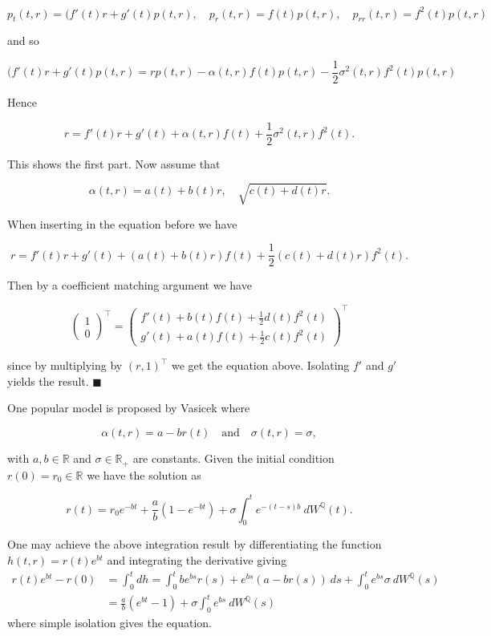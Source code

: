 \documentclass[a4paper,10pt,openany]{book}
\begin{document}
\[
p_t(t,r)=(f'(t)r+g'(t)p(t,r),\quad p_r(t,r)=f(t)p(t,r),\quad p_{rr}(t,r)=f^2(t)p(t,r)
\]

and so

\[
(f'(t)r+g'(t)p(t,r)=rp(t,r)-\alpha(t,r)f(t)p(t,r)-\frac{1}{2}\sigma^2(t,r)f^2(t)p(t,r)
\]

Hence

\[
r=f'(t)r+g'(t)+\alpha(t,r)f(t)+\frac{1}{2}\sigma^2(t,r)f^2(t).
\]

This shows the first part. Now assume that

\[
\alpha(t,r)=a(t)+b(t)r,\quad\sqrt{c(t)+d(t)r}.
\]

When inserting in the equation before we have

\[
 r=f'(t)r+g'(t)+(a(t)+b(t)r)f(t)+\frac{1}{2}(c(t)+d(t)r)f^2(t).
\]

Then by a coefficient matching argument we have

\[
\begin{pmatrix}
1\\ 0
\end{pmatrix}^\top=
\begin{pmatrix}
f'(t)+b(t)f(t)+\frac{1}{2}d(t)f^2(t)\\
g'(t)+a(t)f(t)+\frac{1}{2}c(t)f^2(t)
\end{pmatrix}^\top
\]

since by multiplying by \((r,1)^\top\) we get the equation above. Isolating \(f'\) and \(g'\) yields the result. \(\blacksquare\)

One popular model is proposed by Vasicek where

\[
\alpha(t,r)=a-br(t)\quad \text{and}\quad \sigma(t,r)=\sigma,
\]

with \(a,b\in \mathbb R\) and \(\sigma\in\mathbb R_+\) are constants. Given the initial condition \(r(0)=r_0\in\mathbb R\) we have the solution as

\[
r(t)=r_0e^{-bt}+\frac{a}{b}\left(1-e^{-bt}\right)+\sigma\int_0^t e^{-(t-s)b}\ dW^{\mathbb Q}(t).
\]

One may achieve the above integration result by differentiating the function \(h(t,r)=r(t)e^{bt}\) and integrating the derivative giving
\begin{align*}
r(t)e^{bt}-r(0)&=\int_0^tdh=\int_0^tbe^{bs}r(s)+e^{bs}(a-br(s))\ ds+\int_0^te^{bs}\sigma\ dW^{\mathbb Q}(s)\\
&=\frac{a}{b}(e^{bt}-1)+\sigma\int_0^te^{bs}\ dW^{\mathbb Q}(s)
\end{align*}
where simple isolation gives the equation.
\end{document}
